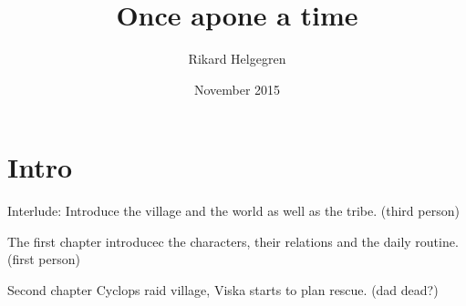 \documentclass{article}
\title{Once apone a time}
\author{Rikard Helgegren}
\date{November 2015}
\begin{document}
\maketitle
\tableofcontents 
\newpage
\section{Intro}

Interlude: Introduce the village and the world as well as the tribe. (third person)

The first chapter introducec the characters, their relations and the daily routine. (first person)

Second chapter Cyclops raid village, Viska starts to plan rescue. (dad dead?)
\end{document}
